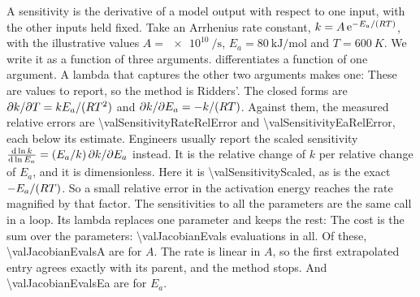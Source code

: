 A sensitivity is the derivative of a model output with respect to one input, with the other inputs held fixed. Take
an Arrhenius rate constant, $k = A\,\mathrm{e}^{-E_a/(R T)}$, with the illustrative values
$A = \SI{e10}{\per\second}$, $E_a = \SI{80}{\kilo\joule\per\mole}$ and $T = \SI{600}{K}$. We write it as a function
 of three arguments.  differentiates a function of one argument. A lambda that
captures the other two arguments makes one:
These are values to report, so the method is Ridders'. The closed forms are $\partial k/\partial T = k
E_a/(R T^2)$ and $\partial k/\partial E_a = -k/(R T)$. Against them, the measured relative errors are
\num{\valSensitivityRateRelError} and \num{\valSensitivityEaRelError}, each below its estimate. Engineers usually
report the scaled sensitivity $\frac{\mathrm{d} \ln k}{\mathrm{d} \ln E_a} = (E_a/k)\,\partial k/\partial E_a$ instead. It is the
relative change of $k$ per relative change of $E_a$, and it is dimensionless. Here it is \num{\valSensitivityScaled},
as is the exact $-E_a/(R T)$. So a small relative error in the activation energy reaches the rate magnified by
that factor. The sensitivities to all the parameters are the same call in a loop. Its lambda replaces one parameter
and keeps the rest:
The cost is the sum over the parameters: \num{\valJacobianEvals} evaluations in all. Of these,
\num{\valJacobianEvalsA} are for $A$. The rate is linear in $A$, so the first extrapolated entry agrees exactly with
its parent, and the method stops. And \num{\valJacobianEvalsEa} are for $E_a$.

